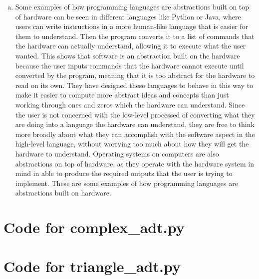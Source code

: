 \documentclass[12pt]{article}
\begin{document}
\begin{enumerate}[(a)]
\item Some examples of how programming languages are abstractions built on top 
of hardware  can be seen in different languages like Python or Java, where users 
can write instructions in a more human-like language that is easier for them 
to understand. Then the program converts it to a list of commands that the 
hardware can actually understand, allowing it to execute what the user wanted. 
This shows that software is an abstraction built on the hardware because the 
user inputs commands that the hardware cannot execute until converted by the 
program, meaning that it is too abstract for the hardware to read on its own. 
They have designed these languages to behave in this way to make it easier to 
compute more abstract ideas and concepts than just working through ones and zeros 
which the hardware can understand. Since the user is not concerned with the 
low-level processed of converting what they are doing into a language the 
hardware can understand, they are free to think more broadly about what they 
can accomplish with the software aspect in the high-level language, without 
worrying too much about how they will get the hardware to understand. Operating 
systems on computers are also abstractions on top of hardware, as they operate 
with the hardware system in mind in able to produce the required outputs that 
the user is trying to implement. These are some examples of how programming 
languages are abstractions built on hardware. 

\end{enumerate}

\newpage

\lstset{language=Python, basicstyle=\tiny, breaklines=true, showspaces=false,
  showstringspaces=false, breakatwhitespace=true}

\def\thesection{\Alph{section}}

\section{Code for complex\_adt.py}

\noindent 

\newpage

\section{Code for triangle\_adt.py}
\end{document}
